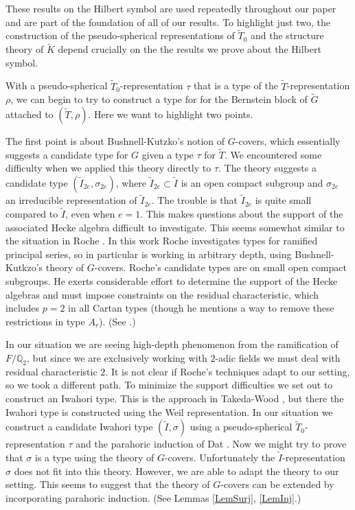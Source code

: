 \documentclass[10pt, letterpaper]{amsart}
\theoremstyle{plain}
\theoremstyle{definition}
\numberwithin{equation}{section}
\newcommand{\Gt}{\widetilde{G}}
\newcommand{\It}{\widetilde{I}}
\newcommand{\Kt}{\widetilde{K}}
\newcommand{\Tt}{\widetilde{T}}
\begin{document}
These results on the Hilbert symbol are used repeatedly throughout our paper and are part of the foundation of all of our results. To highlight just two, the construction of the pseudo-spherical representations of $\Tt_{0}$ and the structure theory of $\Kt$ depend crucially on the the results we prove about the Hilbert symbol.

With a pseudo-spherical $\Tt_{0}$-representation $\tau$ that is a type of the $\Tt$-representation $\rho$, we can begin to try to construct a type for for the Bernstein block of $\Gt$ attached to $(\Tt,\rho)$. Here we want to highlight two points. 

The first point is about Bushnell-Kutzko's notion of $G$-covers, which essentially suggests a candidate type for $G$ given a type $\tau$ for $\Tt$. We encountered some difficulty when we applied this theory directly to $\tau$. The theory suggests a candidate type $(\It_{2e},\sigma_{2e})$, where $\It_{2e}\subset \It$ is an open compact subgroup and $\sigma_{2e}$ an irreducible representation of $\It_{2e}$. The trouble is that $\It_{2e}$ is quite small compared to $\It$, even when $e=1$. This makes questions about the support of the associated Hecke algebra difficult to investigate. This seems somewhat similar to the situation in Roche \cite{R98}. In this work Roche investigates types for ramified principal series, so in particular is working in arbitrary depth, using Bushnell-Kutkzo's theory of $G$-covers. Roche's candidate types are on small open compact subgroups. He exerts considerable effort to determine the support of the Hecke algebras and must impose constraints on the residual characteristic, which includes $p=2$ in all Cartan types (though he mentions a way to remove these restrictions in type $A_r$). (See \cite[pg. 370-379]{R98}.)

In our situation we are seeing high-depth phenomenon from the ramification of $F/\mathbb{Q}_{2}$, but since we are exclusively working with $2$-adic fields we must deal with residual characteristic $2$. It is not clear if Roche's techniques adapt to our setting, so we took a different path. To minimize the support difficulties we set out to construct an Iwahori type. This is the approach in Takeda-Wood \cite{Takeda_Wood}, but there the Iwahori type is constructed using the Weil representation. In our situation we construct a candidate  Iwahori type $(\It,\sigma)$ using a pseudo-spherical $\Tt_{0}$-representation $\tau$ and the parahoric induction of Dat \cite{D09}. Now we might try to prove that $\sigma$ is a type using the theory of $G$-covers. Unfortunately the $\It$-representation $\sigma$ does not fit into this theory. However, we are able to adapt the theory to our setting. This seems to suggest that the theory of $G$-covers can be extended by incorporating parahoric induction. (See Lemmas \ref{LemSurj}, \ref{LemInj}.)
\end{document}
